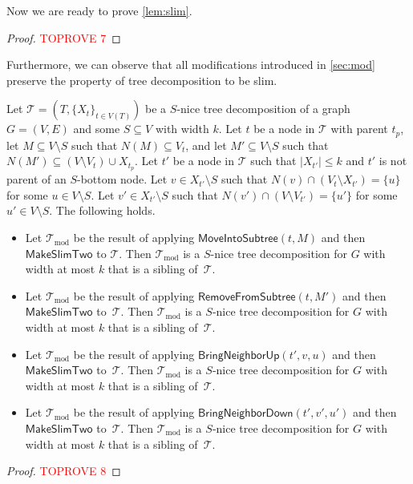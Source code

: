 \documentclass[a4paper,UKenglish,cleveref, autoref, thm-restate, numberwithinsect]{lipics-v2021}
\newcounter{modification}
\newcommand{\slim}{\text{slim}\xspace}
\newcommand{\MoveIntoSubtree}{\mathsf{MoveIntoSubtree}}
\newcommand{\RemoveFromSubtree}{\mathsf{RemoveFromSubtree}}
\newcommand{\BringNeighborUp}{\mathsf{BringNeighborUp}}
\newcommand{\BringNeighborDown}{\mathsf{BringNeighborDown}}
\newcommand{\MakeSlimTwo}{\mathsf{MakeSlimTwo}}
\begin{document}
Now we are ready to prove \cref{lem:slim}.
\begin{proof}\textcolor{red}{TOPROVE 7}\end{proof}

Furthermore, we can observe that all modifications introduced in \cref{sec:mod} preserve the property of tree decomposition to be slim.
\begin{observation} \label{lem:preserveslim}
     Let $\mathcal{T}=(T,\{X_t\}_{t\in V(T)})$ be a \slim $S$-nice tree decomposition of a graph $G=(V,E)$ and some $S\subseteq V$ with width $k$. Let $t$ be a node in $\mathcal{T}$ with parent $t_p$, let $M\subseteq V\setminus S$ such that $N(M)\subseteq V_{t}$, and let $M'\subseteq V\setminus S$ such that $N(M')\subseteq (V\setminus V_{t})\cup X_{t_p}$. 
Let $t'$ be a node in $\mathcal{T}$ such that $|X_{t'}|\le k$ and $t'$ is not parent of an $S$-bottom node. Let $v\in X_{t'}\setminus S$ such that $N(v)\cap (V_t\setminus X_{t'})=\{u\}$ for some $u\in V\setminus S$.
     Let $v'\in X_{t'}\setminus S$ such that $N(v')\cap (V\setminus V_{t'})=\{u'\}$ for some $u'\in V\setminus S$.          
     The following holds.
     \begin{itemize}
     \item Let $\mathcal{T}_{\text{mod}}$ be the result of applying $\MoveIntoSubtree(t, M)$ and then $\MakeSlimTwo$ to $\mathcal{T}$. Then $\mathcal{T}_{\text{mod}}$ is a \slim $S$-nice tree decomposition for $G$ with width at most $k$ that is a sibling of~$\mathcal{T}$.
\item Let $\mathcal{T}_{\text{mod}}$ be the result of applying $\RemoveFromSubtree(t, M')$ and then $\MakeSlimTwo$ to~$\mathcal{T}$. Then $\mathcal{T}_{\text{mod}}$ is a \slim $S$-nice tree decomposition for $G$ with width at most $k$ that is a sibling of~$\mathcal{T}$.
\item Let $\mathcal{T}_{\text{mod}}$ be the result of applying $\BringNeighborUp(t', v, u)$ and then $\MakeSlimTwo$ to~$\mathcal{T}$. Then $\mathcal{T}_{\text{mod}}$ is a \slim $S$-nice tree decomposition for $G$ with width at most $k$ that is a sibling of~$\mathcal{T}$.
\item Let $\mathcal{T}_{\text{mod}}$ be the result of applying $\BringNeighborDown(t', v', u')$ and then $\MakeSlimTwo$ to~$\mathcal{T}$. Then $\mathcal{T}_{\text{mod}}$ is a \slim $S$-nice tree decomposition for $G$ with width at most $k$ that is a sibling of~$\mathcal{T}$.
\end{itemize}
 \end{observation}
\begin{proof}\textcolor{red}{TOPROVE 8}\end{proof}
\end{document}
